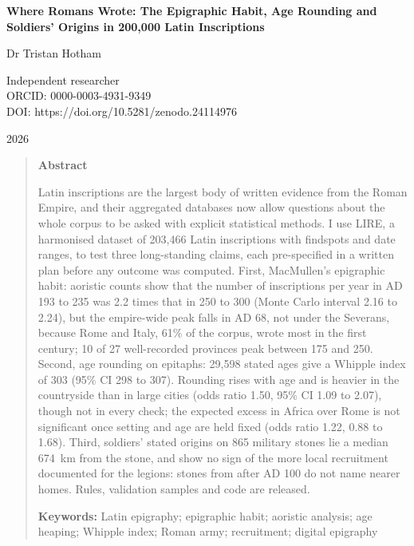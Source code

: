 \documentclass[11pt,a4paper]{article}
\begin{document}
\begin{center}
{\Large\bfseries Where Romans Wrote: The Epigraphic Habit, Age Rounding and Soldiers' Origins in 200,000 Latin Inscriptions\par}
\vspace{1.2em}
{\large Dr Tristan Hotham\par}
\vspace{0.3em}
{\small Independent researcher\\
ORCID: 0000-0003-4931-9349\\
DOI: https://doi.org/10.5281/zenodo.24114976\par}
\vspace{0.8em}
2026
\end{center}

\begin{quote}
\small
\begin{center}\textbf{Abstract}\end{center}
Latin inscriptions are the largest body of written evidence from the Roman Empire, and their aggregated databases now allow questions about the whole corpus to be asked with explicit statistical methods. I use LIRE, a harmonised dataset of 203,466 Latin inscriptions with findspots and date ranges, to test three long-standing claims, each pre-specified in a written plan before any outcome was computed. First, MacMullen's epigraphic habit: aoristic counts show that the number of inscriptions per year in AD 193 to 235 was 2.2 times that in 250 to 300 (Monte Carlo interval 2.16 to 2.24), but the empire-wide peak falls in AD 68, not under the Severans, because Rome and Italy, 61\% of the corpus, wrote most in the first century; 10 of 27 well-recorded provinces peak between 175 and 250. Second, age rounding on epitaphs: 29,598 stated ages give a Whipple index of 303 (95\% CI 298 to 307). Rounding rises with age and is heavier in the countryside than in large cities (odds ratio 1.50, 95\% CI 1.09 to 2.07), though not in every check; the expected excess in Africa over Rome is not significant once setting and age are held fixed (odds ratio 1.22, 0.88 to 1.68). Third, soldiers' stated origins on 865 military stones lie a median 674~km from the stone, and show no sign of the more local recruitment documented for the legions: stones from after AD 100 do not name nearer homes. Rules, validation samples and code are released.

\textbf{Keywords:} Latin epigraphy; epigraphic habit; aoristic analysis; age heaping; Whipple index; Roman army; recruitment; digital epigraphy
\end{quote}
\end{document}
